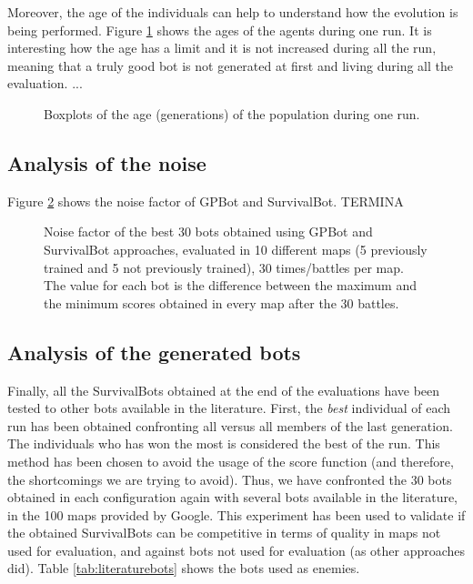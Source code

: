 \documentclass[conference]{IEEEtran}
\begin{document}
Moreover, the age of the individuals can help to understand how the evolution is being
performed. Figure \ref{figura:age} shows the ages of the agents during
one run. It is interesting how the age has a limit and it is not increased during all the run, meaning that a truly good bot is not
generated at first and living during all the evaluation. ... %

\begin{figure}[htb]
\tiny
\begin{center}
\end{center}
\caption{Boxplots of the age (generations) of the population during one run.}

\label{figura:age}
\end{figure}




\subsection{Analysis of the noise}
\label{subsec:analysisnoise}

Figure \ref{figura:noise} shows the noise factor of GPBot and SurvivalBot. TERMINA
\begin{figure}[htb]
\tiny
\begin{center}
\end{center}
\caption{Noise factor of the best 30 bots obtained using GPBot and SurvivalBot approaches, evaluated in 10 different maps (5 previously trained and 5 not previously trained), 30 times/battles per map. The value for each bot is the difference between the maximum and the minimum scores obtained in every map after the 30 battles.}
\label{figura:noise}
\end{figure}





\subsection{Analysis of the generated bots}
\label{subsec:analysisbots}

Finally, all the SurvivalBots obtained at the end of the evaluations have been tested to other bots available in the literature. First, the {\em best} individual of each run has been obtained confronting all versus all members of the last generation. The individuals who has won the most is considered the best of the run. This method has been chosen to avoid the usage of the score function (and therefore, the shortcomings we are trying to avoid). Thus, we have confronted the 30 bots obtained in each configuration again with several bots available in the literature, in the 100 maps provided by Google. This experiment has been used to validate if the obtained SurvivalBots can be competitive in terms of quality in maps not used for evaluation, and against bots not used for evaluation (as other approaches did). Table \ref{tab:literaturebots} shows the bots used as enemies. 
\end{document}
